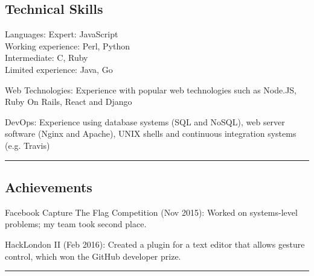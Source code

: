 \documentclass[11pt,a4paper]{article}
\newenvironment{indentsection}[1]%
{\begin{list}{}%
	{\setlength{\leftmargin}{#1}}%
	\item[]%
}
{\end{list}}
\begin{document}
\subsection*{Technical Skills}

\begin{indentsection}{\parindent}
\begin{description*}
	\item[Languages:]
    Expert: JavaScript\\
    Working experience: Perl, Python\\
    Intermediate: C, Ruby\\
    Limited experience: Java, Go
	\item[Web Technologies:]
	    Experience with popular web technologies such as Node.JS, Ruby On Rails, React and Django
	\item[DevOps:]
	Experience using database systems (SQL and NoSQL), web server software (Nginx and Apache), UNIX shells and continuous integration systems (e.g. Travis)
\end{description*}
\end{indentsection}

\vspace{-0.4em}
\hrule
\vspace{-1.2em}
\subsection*{Achievements}
\begin{indentsection}{\parindent}
\begin{description*}
    \item[Facebook Capture The Flag Competition (Nov 2015):] Worked on systems-level problems; my team took second place.
	\item[HackLondon II (Feb 2016):] Created a plugin for a text editor that allows gesture control, which won the GitHub developer prize.
\end{description*}
\end{indentsection}

\vspace{-0.4em}
\hrule
\vspace{-1.2em}
\end{document}
